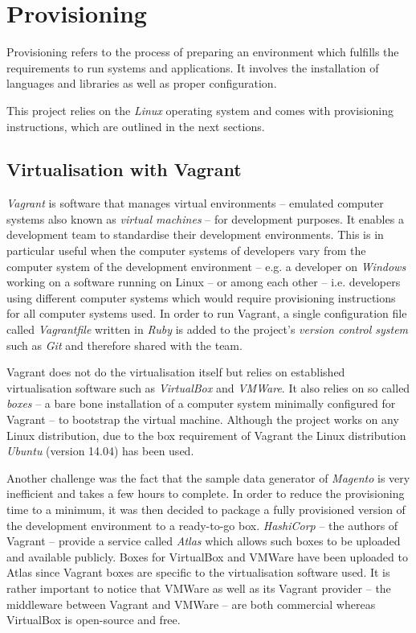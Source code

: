 \section{Provisioning}

Provisioning refers to the process of preparing an environment which fulfills the requirements to run systems and applications. It involves the installation of languages and libraries as well as proper configuration.

This project relies on the \emph{Linux} operating system and comes with provisioning instructions, which are outlined in the next sections.

\subsection{Virtualisation with Vagrant}

\emph{Vagrant} is software that manages virtual environments -- emulated computer systems also known as \emph{virtual machines} -- for development purposes. It enables a development team to standardise their development environments. This is in particular useful when the computer systems of developers vary from the computer system of the development environment -- e.g. a developer on \emph{Windows} working on a software running on Linux -- or among each other -- i.e. developers using different computer systems which would require provisioning instructions for all computer systems used. In order to run Vagrant, a single configuration file called \emph{Vagrantfile} written in \emph{Ruby} is added to the project's \emph{version control system} such as \emph{Git} and therefore shared with the team.

Vagrant does not do the virtualisation itself but relies on established virtualisation software such as \emph{VirtualBox} and \emph{VMWare}. It also relies on so called \emph{boxes} -- a bare bone installation of a computer system minimally configured for Vagrant -- to bootstrap the virtual machine. Although the project works on any Linux distribution, due to the box requirement of Vagrant the Linux distribution \emph{Ubuntu} (version 14.04) has been used.

Another challenge was the fact that the sample data generator of \emph{Magento} is very inefficient and takes a few hours to complete. In order to reduce the provisioning time to a minimum, it was then decided to package a fully provisioned version of the development environment to a ready-to-go box. \emph{HashiCorp} -- the authors of Vagrant -- provide a service called \emph{Atlas} which allows such boxes to be uploaded and available publicly. Boxes for VirtualBox and VMWare have been uploaded to Atlas since Vagrant boxes are specific to the virtualisation software used. It is rather important to notice that VMWare as well as its Vagrant provider -- the middleware between Vagrant and VMWare -- are both commercial whereas VirtualBox is open-source and free.

